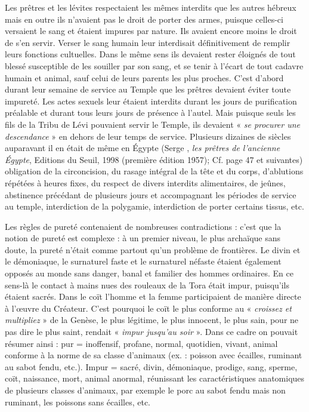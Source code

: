  Les prêtres et les lévites respectaient les mêmes interdits que les autres hébreux mais en outre ils n'avaient pas le droit de porter des armes, puisque celles-ci versaient le sang et étaient impures par nature. Ils avaient encore moins le droit de s'en servir. Verser le sang humain leur interdisait définitivement de remplir leurs fonctions cultuelles. Dans le même sens ils devaient rester éloignés de tout blessé susceptible de les souiller par son sang, et se tenir à l'écart de tout cadavre humain et animal, sauf celui de leurs parents les plus proches. C'est d'abord durant leur semaine de service au Temple que les prêtres devaient éviter toute impureté. Les actes sexuels leur étaient interdits durant les jours de purification préalable et durant tous leurs jours de présence à l'autel. Mais puisque seuls les fils de la Tribu de Lévi pouvaient servir le Temple, ils devaient « \emph{se procurer une descendance} » en dehors de leur temps de service. Plusieurs dizaines de siècles auparavant il en était de même en Égypte (Serge , \emph{les prêtres de l'ancienne Égypte}, Editions du Seuil, 1998 (première édition 1957); Cf. page 47 et suivantes) obligation de la circoncision, du rasage intégral de la tête et du corps, d'ablutions répétées à heures fixes, du respect de divers interdits alimentaires, de jeûnes, abstinence précédant de plusieurs jours et accompagnant les périodes de service au temple, interdiction de la polygamie, interdiction de porter certains tissus, etc. 

 Les règles de pureté contenaient de nombreuses contradictions : c'est que la notion de pureté est complexe : à un premier niveau, le plus archaïque sans doute, la pureté n'était comme partout qu'un problème de frontières. Le divin et le démoniaque, le surnaturel faste et le surnaturel néfaste étaient également opposés au monde sans danger, banal et familier des hommes ordinaires. En ce sens-là le contact à mains nues des rouleaux de la Tora était impur, puisqu'ils étaient sacrés. Dans le coït l'homme et la femme participaient de manière directe à l'œuvre du Créateur. C'est pourquoi le coït le plus conforme au « \emph{croissez et multipliez} » de la Genèse, le plus légitime, le plus innocent, le plus sain, pour ne pas dire le plus saint, rendait « \emph{impur jusqu'au soir} ». Dans ce cadre on pouvait résumer ainsi : pur = inoffensif, profane, normal, quotidien, vivant, animal conforme à la norme de sa classe d'animaux (ex. : poisson avec écailles, ruminant au sabot fendu, etc.). Impur = sacré, divin, démoniaque, prodige, sang, sperme, coït, naissance, mort, animal anormal, réunissant les caractéristiques anatomiques de plusieurs classes d'animaux, par exemple le porc au sabot fendu mais non ruminant, les poissons sans écailles, etc. 

